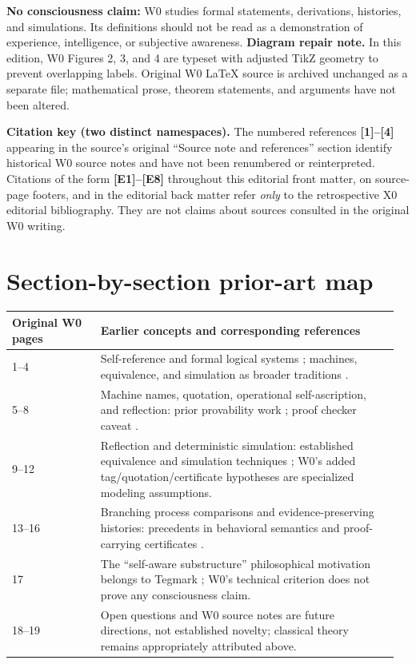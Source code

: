 \documentclass[11pt,letterpaper]{article}
\begin{document}
\textbf{No consciousness claim:} W0 studies formal statements, derivations, histories, and simulations. Its definitions should not be read as a demonstration of experience, intelligence, or subjective awareness.
\noindent\textbf{Diagram repair note.} In this edition, W0 Figures 2, 3, and 4 are typeset with adjusted TikZ geometry to prevent overlapping labels. Original W0 LaTeX source is archived unchanged as a separate file; mathematical prose, theorem statements, and arguments have not been altered.\par\medskip
\noindent\textbf{Citation key (two distinct namespaces).} The numbered references \textbf{[1]--[4]} appearing in the source's original ``Source note and references'' section identify historical W0 source notes and have not been renumbered or reinterpreted. Citations of the form \textbf{[E1]--[E8]} throughout this editorial front matter, on source-page footers, and in the editorial back matter refer \emph{only} to the retrospective X0 editorial bibliography. They are not claims about sources consulted in the original W0 writing.\par\medskip
\clearpage
\section*{Section-by-section prior-art map}
\small
\begin{longtable}{@{}p{0.22\linewidth}p{0.74\linewidth}@{}}
\toprule Original W0 pages & Earlier concepts and corresponding references \\\midrule
1--4 & Self-reference and formal logical systems \cite{godel,lob,feferman}; machines, equivalence, and simulation as broader traditions \cite{nerode,milner}. \\
5--8 & Machine names, quotation, operational self-ascription, and reflection: prior provability work \cite{godel,lob,feferman}; proof checker caveat \cite{necula}. \\
9--12 & Reflection and deterministic simulation: established equivalence and simulation techniques \cite{nerode,milner}; W0's added tag/quotation/certificate hypotheses are specialized modeling assumptions. \\
13--16 & Branching process comparisons and evidence-preserving histories: precedents in behavioral semantics \cite{milner} and proof-carrying certificates \cite{necula,besson}. \\
17 & The ``self-aware substructure'' philosophical motivation belongs to Tegmark \cite{tegmark}; W0's technical criterion does not prove any consciousness claim. \\
18--19 & Open questions and W0 source notes are future directions, not established novelty; classical theory remains appropriately attributed above. \\
\bottomrule
\end{longtable}
\normalsize
\clearpage
{}
{}
\end{document}
